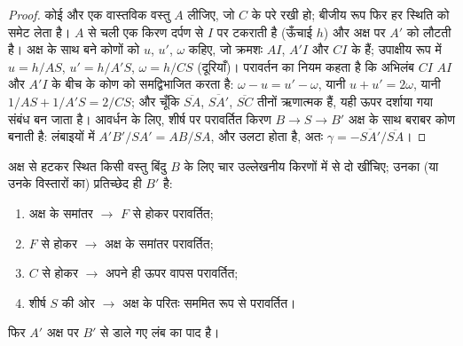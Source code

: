 \begin{proof}
कोई  और एक वास्तविक वस्तु $A$ लीजिए, जो $C$ के परे रखी हो; बीजीय
रूप फिर हर स्थिति को समेट लेता है। $A$ से चली एक किरण दर्पण से $I$ पर टकराती है
(ऊँचाई $h$) और अक्ष पर $A'$ को लौटती है। अक्ष के साथ बने कोणों को $u$, $u'$,
$\omega$ कहिए, जो क्रमशः $AI$, $A'I$ और $CI$ के हैं; उपाक्षीय रूप में
$u = h/AS$, $u' = h/A'S$, $\omega = h/CS$ (दूरियाँ)। परावर्तन का
नियम कहता है कि अभिलंब $CI$ $AI$ और $A'I$ के बीच के कोण को समद्विभाजित करता
है: $\omega - u = u' - \omega$, यानी $u + u' = 2\omega$, यानी
$1/AS + 1/A'S = 2/CS$; और चूँकि $\overline{SA}$, $\overline{SA'}$,
$\overline{SC}$ तीनों ऋणात्मक हैं, यही ऊपर दर्शाया गया संबंध बन जाता है।
आवर्धन के लिए, शीर्ष पर परावर्तित किरण $B \to S \to B'$ अक्ष के साथ बराबर
कोण बनाती है: लंबाइयों में $A'B'/SA' = AB/SA$, और  उलटा होता है,
अतः $\gamma = -\overline{SA'}/\overline{SA}$।
\end{proof}

\begin{method}[दर्पण में प्रतिबिंब की रचना]\label{met:b1:mirrors-thin-lenses:mirrorrays}
अक्ष से हटकर स्थित किसी वस्तु बिंदु $B$ के लिए चार उल्लेखनीय किरणों में से दो
खींचिए; उनका (या उनके विस्तारों का) प्रतिच्छेद ही $B'$ है:
\begin{enumerate}
  \item अक्ष के समांतर $\to$ $F$ से होकर परावर्तित;
  \item $F$ से होकर $\to$ अक्ष के समांतर परावर्तित;
  \item $C$ से होकर $\to$ अपने ही ऊपर वापस परावर्तित;
  \item शीर्ष $S$ की ओर $\to$ अक्ष के परितः सममित रूप से परावर्तित।
\end{enumerate}
फिर $A'$ अक्ष पर $B'$ से डाले गए लंब का पाद है।
\end{method}

